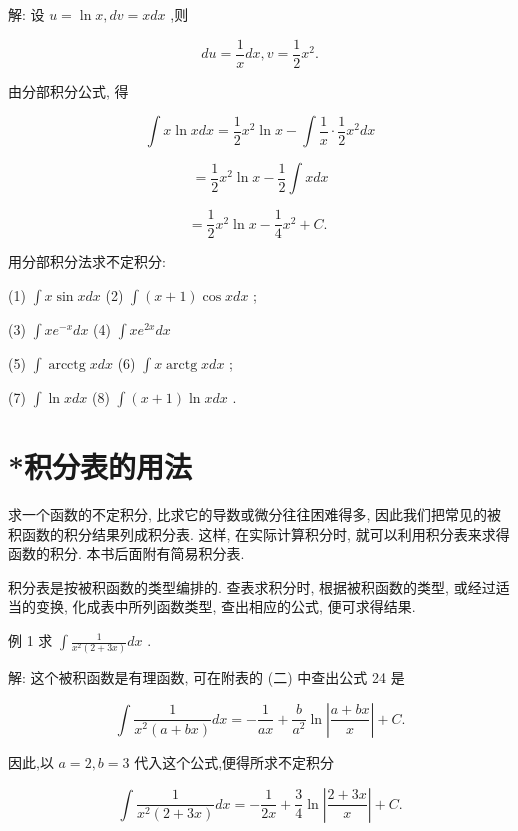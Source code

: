 \documentclass[lang=cn,newtx,10pt,scheme=chinese]{elegantbook}
\begin{document}
解: 设 \(u = \ln x,{dv} = {xdx}\) ,则

\[
{du} = \frac{1}{x}{dx},v = \frac{1}{2}{x}^{2}.
\]

由分部积分公式, 得

\[
\int x\ln {xdx} = \frac{1}{2}{x}^{2}\ln x - \int \frac{1}{x} \cdot \frac{1}{2}{x}^{2}{dx}
\]

\[
= \frac{1}{2}{x}^{2}\ln x - \frac{1}{2}\int {xdx}
\]

\[
= \frac{1}{2}{x}^{2}\ln x - \frac{1}{4}{x}^{2} + C\text{. }
\]

\begin{problemset}[练习]

\item 用分部积分法求不定积分:

(1) \(\int x\sin {xdx}\) (2) \(\int \left( {x + 1}\right) \cos {xdx}\) ;

(3) \(\int x{e}^{-x}{dx}\) (4) \(\int x{e}^{2x}{dx}\)

(5) \(\int \operatorname{arcctg}{xdx}\) (6) \(\int x\operatorname{arctg}{xdx}\) ;

(7) \(\int \ln {xdx}\) (8) \(\int \left( {x + 1}\right) \ln {xdx}\) .

\end{problemset}

\section*{*积分表的用法}

求一个函数的不定积分, 比求它的导数或微分往往困难得多, 因此我们把常见的被积函数的积分结果列成积分表. 这样, 在实际计算积分时, 就可以利用积分表来求得函数的积分. 本书后面附有简易积分表.

积分表是按被积函数的类型编排的. 查表求积分时, 根据被积函数的类型, 或经过适当的变换, 化成表中所列函数类型, 查出相应的公式, 便可求得结果.

例 1 求 \(\int \frac{1}{{x}^{2}\left( {2 + {3x}}\right) }{dx}\) .

解: 这个被积函数是有理函数, 可在附表的 (二) 中查出公式 24 是

\[
\int \frac{1}{{x}^{2}\left( {a + {bx}}\right) }{dx} = - \frac{1}{ax} + \frac{b}{{a}^{2}}\ln \left| \frac{a + {bx}}{x}\right| + C.
\]

因此,以 \(a = 2,b = 3\) 代入这个公式,便得所求不定积分

\[
\int \frac{1}{{x}^{2}\left( {2 + {3x}}\right) }{dx} = - \frac{1}{2x} + \frac{3}{4}\ln \left| \frac{2 + {3x}}{x}\right| + C.
\]
\end{document}
